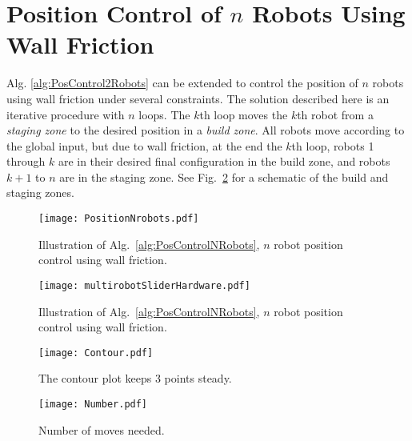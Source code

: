 \section{Position Control of $n$ Robots Using Wall Friction}\label{sec:PostionControlnRobots}
Alg. \ref{alg:PosControl2Robots}  can be extended to control the position of $n$ robots using wall friction under several constraints. The solution described here is an iterative procedure with $n$ loops. The $k$th loop moves the $k$th robot from a \emph{staging zone} to the desired position in a \emph{build zone}. All robots move according to the global input, but due to wall friction, at the end the $k$th loop, robots 1 through $k$ are in their desired final configuration in the build zone, and robots $k+1$ to $n$ are in the staging zone. See Fig.~\ref{fig:construction2d} for a schematic of the build and staging zones.
\begin{figure}
\begin{center}
	\texttt{[image: PositionNrobots.pdf]}
\end{center}
\vspace{-1em}
\caption{\label{fig:simulationNrobot}
Illustration of Alg.\ \ref{alg:PosControlNRobots}, $n$ robot position control  using wall friction.
}
\end{figure}

\begin{figure}
\begin{center}
	\texttt{[image: multirobotSliderHardware.pdf]}
\end{center}
\vspace{-1em}
\caption{\label{fig:construction2d}
Illustration of Alg.\ \ref{alg:PosControlNRobots}, $n$ robot position control  using wall friction.
}
\end{figure}

\begin{figure}
\begin{center}
	\texttt{[image: Contour.pdf]}
\end{center}
\vspace{-1em}
\caption{\label{fig:contour}
The contour plot keeps 3 points steady.
}
\end{figure}

\begin{figure}
\begin{center}
	\texttt{[image: Number.pdf]}
\end{center}
\vspace{-1em}
\caption{\label{fig:numberPlot}
Number of moves needed.
}
\end{figure}


